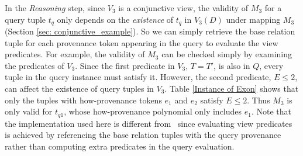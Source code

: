 \begin{example}
In the {\em Reasoning} step, since $V_3$ is a {conjunctive view}, the validity of $M_3$ for a query tuple $t_q$ only depends on the {\em existence} of $t_q$ in $V_3(D)$ under mapping $M_3$ (Section \ref{sec: conjunctive_example}). So we can simply retrieve the base relation tuple for each provenance token appearing in the query to evaluate the view {predicates}. For example, the validity of $M_3$ can be checked simply by examining the predicates of $V_3$. Since the first predicate in $V_3$, $T = T'$, is also in $Q$, every tuple in the query instance must satisfy it. However, the second predicate, $E \leq 2$, can affect the {existence} of query tuples in $V_3$. Table \ref{Instance of Exon} shows that only the tuples with how-provenance tokens $e_1$ and $e_2$ satisfy $E \leq 2$. Thus $M_3$ is only valid for $t_{{q}1}$, whose how-provenance polynomial only includes $e_1$. %
{Note that the implementation used here is different from \rba\ since evaluating view predicates is achieved by {referencing the base relation tuples with the query provenance} rather than computing extra predicates in the query evaluation.}  


\end{example}
